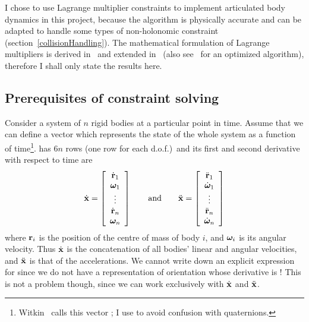 I chose to use Lagrange multiplier constraints to implement articulated body dynamics in this
project, because the algorithm is physically accurate and can be adapted to handle some types of
non-holonomic constraint (section~\ref{collisionHandling}).
The mathematical formulation of Lagrange multipliers is derived in~\cite{BaraffWitkin:97} and
extended in~\cite{Saunders:PhD} (also see~\cite{Baraff:96} for an optimized algorithm),
therefore I shall only state the results here.

\subsection{Prerequisites of constraint solving}

Consider a system of $n$ rigid bodies at a particular point in time. Assume that we can define
a vector  which represents the state of the whole system as a function of
time\footnote{Witkin~\cite{BaraffWitkin:97} calls this vector ; I use  to avoid
confusion with quaternions.}.  has $6n$ rows (one row for each d.o.f.)\ and its first and
second derivative with respect to time are
\begin{equation}
\label{lagrangeStateVector}
\dot{\ve{x}} = \left[ \begin{array}{c}
    \dot{\ve{r}}_1\\ \ve{\omega}_1\\ \vdots\\ \dot{\ve{r}}_n\\ \ve{\omega}_n \end{array}\right]
\quad\quad\mathrm{and}\quad\quad
\ddot{\ve{x}} = \left[ \begin{array}{c}
    \ddot{\ve{r}}_1\\ \dot{\ve{\omega}}_1\\ \vdots\\ \ddot{\ve{r}}_n\\ \dot{\ve{\omega}}_n
    \end{array}\right]
\end{equation}
where $\ve{r}_i$ is the position of the centre of mass of body $i$, and $\ve{\omega}_i$ is its
angular velocity. Thus $\dot{\ve{x}}$ is the concatenation of all bodies' linear and angular
velocities, and $\ddot{\ve{x}}$ is that of the accelerations. We cannot write down an explicit
expression for  since we do not have a representation of orientation whose derivative is
\ve{\omega}! This is not a problem though, since we can work exclusively with $\dot{\ve{x}}$ and
$\ddot{\ve{x}}$.

